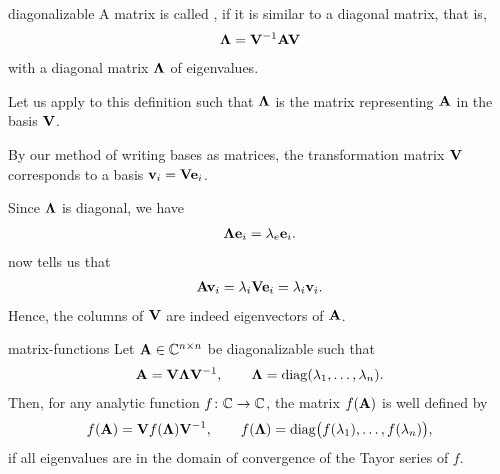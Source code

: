 \begin{Definition}{diagonalizable}
  A matrix is called , if it is similar to a diagonal matrix, that is,
  \begin{gather}
    \boldsymbol\Lambda = \mathbf V^{-1} \mathbf A \mathbf V
  \end{gather}
  with a diagonal matrix $\boldsymbol\Lambda$ of eigenvalues.
\end{Definition}

\begin{remark}
  Let us apply  to this
  definition such that $\boldsymbol\Lambda$ is the matrix representing $\mathbf A$
  in the basis $\mathbf V$.

  By our method of writing bases as matrices, the transformation
  matrix $\mathbf V$ corresponds to a basis $\mathbf v_i = \mathbf V\mathbf e_i$.

  Since $\boldsymbol\Lambda$ is diagonal, we have
  \begin{gather}
    \boldsymbol\Lambda\mathbf e_i = \lambda_e\mathbf e_i.
  \end{gather}
   now tells us that
  \begin{gather}
    \mathbf A\mathbf v_i = \lambda_i\mathbf V\mathbf e_i=\lambda_i\mathbf v_i.    
  \end{gather}
  Hence, the columns of $\mathbf V$ are indeed eigenvectors of $\mathbf A$.
\end{remark}

\begin{Theorem}{matrix-functions}
  Let $\mathbf A\in \mathbb C^{n\times n}$ be diagonalizable such that
  \begin{gather}
    \mathbf A = \mathbf V \boldsymbol\Lambda \mathbf V^{-1},
    \qquad \boldsymbol\Lambda = \operatorname{diag}(\lambda_1,\dots,\lambda_n).
  \end{gather}
  Then, for any analytic function $f\colon \mathbb C \to \mathbb C$, the matrix
  $f(\mathbf A)$ is well defined by
  \begin{gather}
    f(\mathbf A) = \mathbf V f(\boldsymbol\Lambda) \mathbf V^{-1},
    \qquad f(\boldsymbol\Lambda) = \operatorname{diag}\bigl(f(\lambda_1),\dots,f(\lambda_n)\bigr),
  \end{gather}
  if all eigenvalues are in the domain of convergence of the Tayor
  series of $f$.
\end{Theorem}

